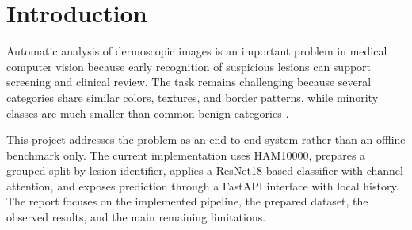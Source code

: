 \section{Introduction}

Automatic analysis of dermoscopic images is an important problem in medical computer vision because early recognition of suspicious lesions can support screening and clinical review. The task remains challenging because several categories share similar colors, textures, and border patterns, while minority classes are much smaller than common benign categories \citep{esteva2017skin,tschandl2018ham10000}.

This project addresses the problem as an end-to-end system rather than an offline benchmark only. The current implementation uses HAM10000, prepares a grouped split by lesion identifier, applies a ResNet18-based classifier with channel attention, and exposes prediction through a FastAPI interface with local history. The report focuses on the implemented pipeline, the prepared dataset, the observed results, and the main remaining limitations.
